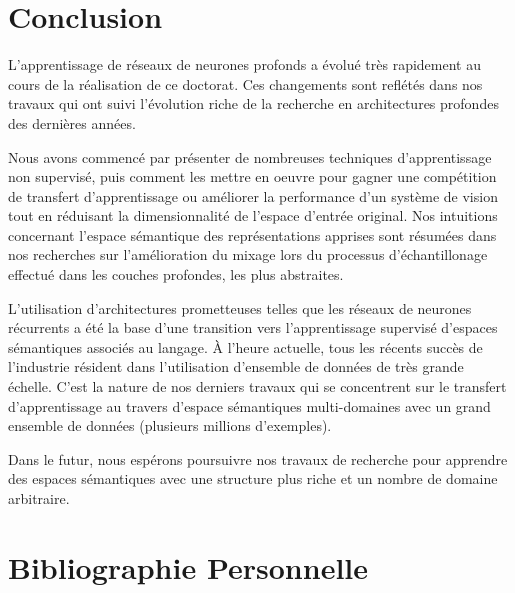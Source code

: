 
\chapter{Conclusion}

L'apprentissage de réseaux de neurones profonds a évolué très rapidement au
cours de la réalisation de ce doctorat. Ces changements sont reflétés dans nos
travaux qui ont suivi l'évolution riche de la recherche en architectures
profondes des dernières années.

Nous avons commencé par présenter de nombreuses techniques d'apprentissage non
supervisé, puis comment les mettre en oeuvre pour gagner une compétition de
transfert d'apprentissage ou améliorer la performance d'un système de vision
tout en réduisant la dimensionnalité de l'espace d'entrée original.  Nos
intuitions concernant l'espace sémantique des représentations apprises sont
résumées dans nos recherches sur l'amélioration du mixage lors du processus
d'échantillonage effectué dans les couches profondes, les plus abstraites.

L'utilisation d'architectures prometteuses telles que les réseaux de neurones
récurrents a été la base d'une transition vers l'apprentissage supervisé
d'espaces sémantiques associés au langage. À l'heure actuelle, tous les récents succès de
l'industrie résident dans l'utilisation d'ensemble de données de très grande échelle.
C'est la nature de nos derniers travaux qui se concentrent sur le transfert
d'apprentissage au travers d'espace sémantiques multi-domaines avec un grand
ensemble de données (plusieurs millions d'exemples).

Dans le futur, nous espérons poursuivre nos travaux de recherche pour apprendre
des espaces sémantiques avec une structure plus riche et un nombre de domaine
arbitraire.

\chapter{Bibliographie Personnelle}

